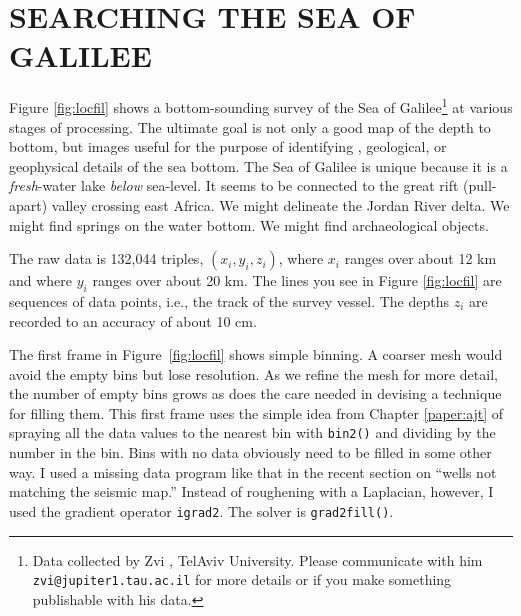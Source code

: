 \section{SEARCHING THE SEA OF GALILEE}
Figure \ref{fig:locfil} shows a bottom-sounding survey
of the Sea of Galilee\footnote{
        Data collected by Zvi , TelAviv University.
        Please communicate with him {\tt zvi@jupiter1.tau.ac.il}
        for more details or if you make something
        publishable with his data.
        }
at various stages of processing.
The ultimate goal is not only a good map of
the depth to bottom,
but images useful for the purpose
of identifying , geological, or
geophysical details of the sea bottom.
The Sea of Galilee is unique
because it is a {\it fresh}-water lake {\it below} sea-level.
It seems to be connected to the great rift (pull-apart)
valley crossing east Africa.
We might delineate the Jordan River delta.
We might find springs on the water bottom.
We might find archaeological objects.
\par
{}
The raw data is 132,044 triples, $(x_i,y_i,z_i)$,
where $x_i$ ranges over about 12 km and
where $y_i$ ranges over about 20 km.
The lines you see in Figure \ref{fig:locfil}
are sequences of data points, i.e., the track of the survey vessel.
The depths $z_i$ are recorded to an accuracy of about 10 cm.
\par
The first frame in Figure~\ref{fig:locfil} shows simple binning.
A coarser mesh would avoid the empty bins but lose resolution.
As we refine the mesh for more detail,
the number of empty bins grows
as does the care needed in devising a technique
for filling them.
This first frame uses the simple idea from Chapter \ref{paper:ajt} of
spraying all the data values to the nearest bin
with \texttt{bin2()} 
and dividing by the number in the bin.
Bins with no data obviously need to be filled in some other way.
I used a missing data program like that in the recent section
on ``wells not matching the seismic map.''
Instead of roughening with a Laplacian, however,
I used the gradient operator \texttt{igrad2}. 
The solver is \texttt{grad2fill()}.

